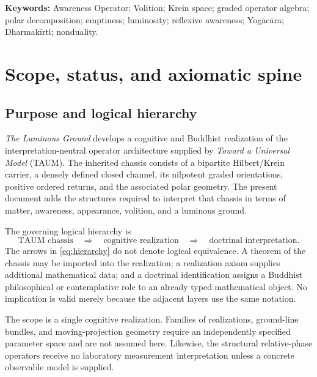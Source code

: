 \documentclass[11pt,reqno]{scrartcl}
\theoremstyle{plain}
\theoremstyle{definition}
\theoremstyle{remark}
\begin{document}
\medskip
\noindent\textbf{Keywords:} Awareness Operator; Volition; Krein space; graded
operator algebra; polar decomposition; emptiness; luminosity; reflexive
awareness; Yog\=ac\=ara; Dharmak\=irti; nonduality.

\clearpage
\setcounter{tocdepth}{2}
\tableofcontents

\clearpage
\section{Scope, status, and axiomatic spine}
\label{sec:charter}

\subsection{Purpose and logical hierarchy}

\emph{The Luminous Ground} develops a cognitive and Buddhist realization of
the interpretation-neutral operator architecture supplied by \emph{Toward a
Universal Model} (TAUM).  The inherited chassis consists of a bipartite
Hilbert/Krein carrier, a densely defined closed channel, its nilpotent graded
orientations, positive ordered returns, and the associated polar geometry.
The present document adds the structures required to interpret that chassis
in terms of matter, awareness, appearance, volition, and a luminous ground.

The governing logical hierarchy is
\begin{equation}
  \boxed{
  \text{TAUM chassis}
  \quad\Longrightarrow\quad
  \text{cognitive realization}
  \quad\Longrightarrow\quad
  \text{doctrinal interpretation}.}
  \label{eq:hierarchy}
\end{equation}
The arrows in \eqref{eq:hierarchy} do not denote logical equivalence.  A
theorem of the chassis may be imported into the realization; a realization
axiom supplies additional mathematical data; and a doctrinal identification
assigns a Buddhist philosophical or contemplative role to an already typed
mathematical object.  No implication is valid merely because the adjacent
layers use the same notation.

The scope is a single cognitive realization.  Families of realizations,
ground-line bundles, and moving-projection geometry require an independently
specified parameter space and are not assumed here.  Likewise, the
structural relative-phase operators receive no laboratory measurement
interpretation unless a concrete observable model is supplied.
\end{document}
